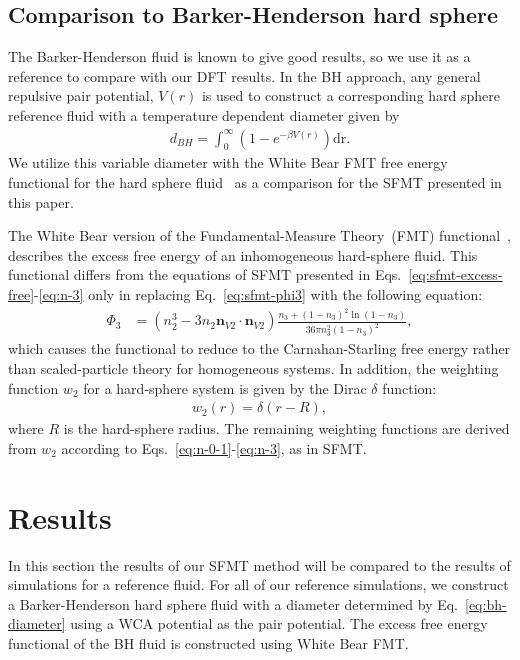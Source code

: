 \documentclass[letterpaper,twocolumn,amsmath,amssymb,prb]{revtex4-1}
\begin{document}
\subsection{Comparison to Barker-Henderson hard sphere}

The Barker-Henderson fluid is known to give good results, so we use it 
as a reference to compare with our DFT results. 
In the BH approach, any general
repulsive pair potential, $V(r)$ is used to construct a corresponding hard
sphere reference fluid with a temperature dependent diameter given by
\begin{align}
  d_{BH} = \int_0^{\infty}\left( 1 - e^{-\beta V(r)} \right)\mathrm{dr}.
  \label{eq:bh-diameter}
\end{align}
We utilize this variable diameter with the White Bear FMT free energy
functional for the hard sphere fluid~\cite{roth2002whitebear} as a
comparison for the SFMT presented in this paper.

The White Bear version of the Fundamental-Measure Theory~(FMT)
functional~\cite{roth2002whitebear}, describes the excess free energy
of an inhomogeneous hard-sphere fluid.  This functional differs
from the equations of SFMT presented in
Eqs.~\ref{eq:sfmt-excess-free}-\ref{eq:n-3} only in replacing
Eq.~\ref{eq:sfmt-phi3} with the following equation:
\begin{align}
\Phi_3 &= (n_2^3 - 3 n_2 \mathbf{n}_{V2} \cdot \mathbf{n}_{V2}) \frac{
  n_3 + (1-n_3)^2 \ln(1-n_3)
}{
  36\pi n_3^2\left( 1 - n_3 \right)^2
} , 
\end{align}
which causes the functional to reduce to the Carnahan-Starling free
energy rather than scaled-particle theory for homogeneous systems. In
addition, the weighting function $w_2$ for a hard-sphere system is
given by the Dirac $\delta$ function:
\begin{align}
  w_2(r) = \delta(r - R),
\end{align}
where $R$ is the hard-sphere radius. The remaining weighting
functions are derived from $w_2$ according to
Eqs.~\ref{eq:n-0-1}-\ref{eq:n-3}, as in SFMT.

\section{Results}
In this section the results of our SFMT method will be compared to the results of simulations for a reference fluid.
For all of our reference simulations, we construct a Barker-Henderson hard
sphere fluid with a diameter determined by Eq.~\ref{eq:bh-diameter}
using a WCA potential as the pair potential. The excess free energy functional of the 
BH fluid is constructed using White Bear FMT. %
\end{document}
